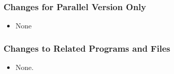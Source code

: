 \documentclass[11pt]{article}
\begin{document}
\subsubsection{Changes for Parallel Version Only}

\begin{itemize}
\item None
\end{itemize}

\subsubsection{Changes to Related Programs and Files}

\begin{itemize}
\item None.
\end{itemize}

\newpage
\end{document}
